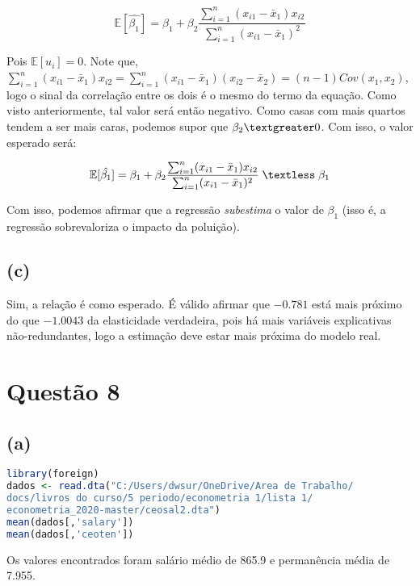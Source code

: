 \documentclass[12pt]{article}
\begin{document}
\begin{equation*}
	\mathbb{E}[\hat{\beta_{1}}]=\beta_{1}+
	\beta_{2}\frac            {\sum_{i=1}^{n}(x_{i1}-\bar{x}_{1})x_{i2}}
							  {\sum_{i=1}^{n}(x_{i1}-\bar{x}_1)^{2}}
\end{equation*}

Pois $\mathbb{E}[u_{i}]=0$. Note que, $\sum_{i=1}^{n}(x_{i1}-\bar{x}_{1})x_{i2}=
\sum_{i=1}^{n}(x_{i1}-\bar{x}_{1})(x_{i2}-\bar{x}_{2})=(n-1)Cov(x_1,x_2)$, logo o sinal da correlação entre os dois é o mesmo do termo da equação. Como visto anteriormente, tal valor será então negativo. Como casas com mais quartos tendem a ser mais caras, podemos supor que $\beta_{2}\textgreater 0$. Com isso, o valor esperado será:

\begin{equation*}
	\mathbb{E}[\hat{\beta_{1}}]=\beta_{1}+
	\beta_{2}\frac            {\sum_{i=1}^{n}(x_{i1}-\bar{x}_{1})x_{i2}}
						      {\sum_{i=1}^{n}(x_{i1}-\bar{x}_1)^{2}}
	\;\textless \; \beta_{1}					      
\end{equation*}

Com isso, podemos afirmar que a regressão \textit{subestima} o valor de $\beta_{1}$ (isso é, a regressão sobrevaloriza o impacto da poluição).

\subsection*{(c)}
Sim, a relação é como esperado. É válido afirmar que $-0.781$ está mais próximo do que $-1.0043$ da elasticidade verdadeira, pois há mais variáveis explicativas não-redundantes, logo a estimação deve estar mais próxima do modelo real.

\section*{Questão 8}

\subsection*{(a)}

\begin{lstlisting}[language=R]
library(foreign)
dados <- read.dta("C:/Users/dwsur/OneDrive/Area de Trabalho/
docs/livros do curso/5 periodo/econometria 1/lista 1/
econometria_2020-master/ceosal2.dta")
mean(dados[,'salary'])
mean(dados[,'ceoten'])
\end{lstlisting}

Os valores encontrados foram salário médio de 865.9 e permanência média de 7.955.\\
\end{document}
